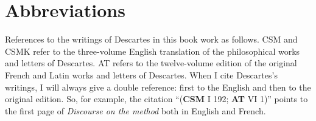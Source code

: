 \chapter{Abbreviations}

\begin{description}[leftmargin=*,widest=CSMKCS,]
    \item[AG] 
    \item[ALQ] 
    \item[AT] 
    \item[CB] 
    \item[CSM] 
    \item[CSMK] 
    \item[EB] 
    \item[NLS] 
    \item[OLD] 
\end{description}

References to the writings of Descartes in this book work as follows. CSM and CSMK refer to the three-volume English translation of the philosophical works and letters of Descartes. AT refers to the twelve-volume edition of the original French and Latin works and letters of Descartes. When I cite Descartes's writings, I will always give a double reference: first to the English and then to the original edition. So, for example, the citation ``(\textbf{CSM} I 192; \textbf{AT} VI 1)'' points to the first page of \textit{Discourse on the method} both in English and French.

